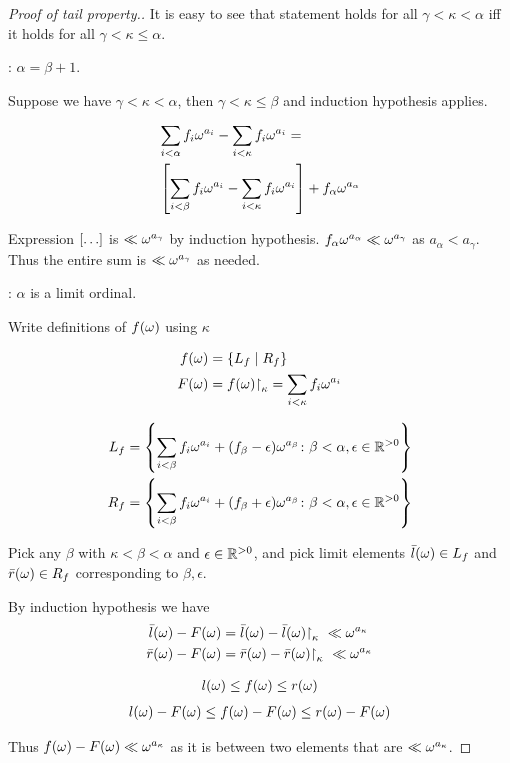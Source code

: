 \begin{proof}[Proof of tail property.] %

It is easy to see that statement holds for all $\gamma < \kappa < \alpha$ iff it holds for all $\gamma < \kappa \leq \alpha$.

: $\alpha = \beta + 1$.

Suppose we have $\gamma < \kappa < \alpha$, then $\gamma < \kappa \leq \beta$ and induction hypothesis applies.

\begin{align*}
	&\sum_{i < \alpha} f_i \omega^{a_i} - \sum_{i < \kappa} f_i \omega^{a_i} = \\
	&\left[ \sum_{i < \beta} f_i \omega^{a_i} - \sum_{i < \kappa} f_i \omega^{a_i} \right] + f_\alpha \omega^{a_\alpha}
\end{align*}

Expression $\left[ \ldots \right]$ is $\ll \omega^{a_\gamma}$ by induction hypothesis. $f_\alpha \omega^{a_\alpha} \ll \omega^{a_\gamma}$ as $a_\alpha < a_\gamma$. Thus the entire sum is $\ll \omega^{a_\gamma}$ as needed.

: $\alpha$ is a limit ordinal.

Write definitions of $f(\omega)$ using $\kappa$

\begin{align*}
  f(\omega) &= \left\{ L_f \mid R_f \right\} \\
  F(\omega) &= f(\omega)\mathord{\upharpoonright}_{\kappa} = \sum_{i < \kappa} f_i \omega^{a_i}
\end{align*}

\begin{align*}
  L_f &= \left\{ \sum_{i < \beta} f_i \omega^{a_i} + (f_\beta - \epsilon) \omega^{a_\beta}
	\colon \beta < \alpha, \epsilon \in \mathbb{R}^{>0} \right\} \\
  R_f &= \left\{ \sum_{i < \beta} f_i \omega^{a_i} + (f_\beta + \epsilon) \omega^{a_\beta}
	\colon \beta < \alpha, \epsilon \in \mathbb{R}^{>0} \right\} \\
\end{align*}

Pick any $\beta$ with $\kappa < \beta < \alpha$ and $\epsilon \in \mathbb{R}^{>0}$,
and pick limit elements $\bar l(\omega) \in L_f$ and $\bar r(\omega) \in R_f$ corresponding to $\beta, \epsilon$.

By induction hypothesis we have 
\begin{align*}
	\bar l(\w) - F(\w) &= \bar l(\w) - \bar l(\w)\midr\kappa \ \ll  \w^{a_\kappa} \\
	\bar r(\w) - F(\w) &= \bar r(\w) - \bar r(\w)\midr\kappa \ \ll  \w^{a_\kappa}
\end{align*}

\begin{align*}
	l(\omega) \leq f(\omega) \leq r(\omega) \\
\end{align*}
\begin{align*}
	l(\omega) - F(\omega) \leq f(\omega) - F(\omega) \leq r(\omega) - F(\omega)
\end{align*}
 
Thus $f(\omega) - F(\omega) \ll \omega^{a_\kappa}$ as it is between two elements that are $\ll  \omega^{a_\kappa}$.

\end{proof}

